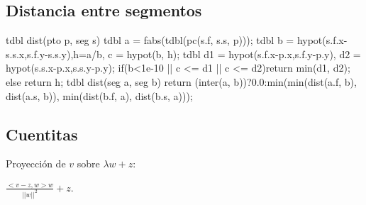 \documentclass[10pt,landscape,twocolumn,a4paper,notitlepage]{article}
\begin{document}
\subsection{Distancia entre segmentos}
\begin{code}
tdbl dist(pto p, seg s){
	tdbl a = fabs(tdbl(pc(s.f, s.s, p)));
	tdbl b = hypot(s.f.x-s.s.x,s.f.y-s.s.y),h=a/b, c = hypot(b, h);
	tdbl d1 = hypot(s.f.x-p.x,s.f.y-p.y), d2 = hypot(s.s.x-p.x,s.s.y-p.y);
	if(b<1e-10 || c <= d1 || c <= d2)return min(d1, d2); else return h;
}
tdbl dist(seg a, seg b){
	return (inter(a, b))?0.0:min(min(dist(a.f, b), dist(a.s, b)), min(dist(b.f, a), dist(b.s, a)));
}
\end{code}
\subsection{Cuentitas}
Proyecci\'on de $v$ sobre $\lambda w + z$:\\
\begin{center}
{\Large $\frac{<v-z, w>w}{||w||^2}+z$.}
\end{center}
\end{document}
